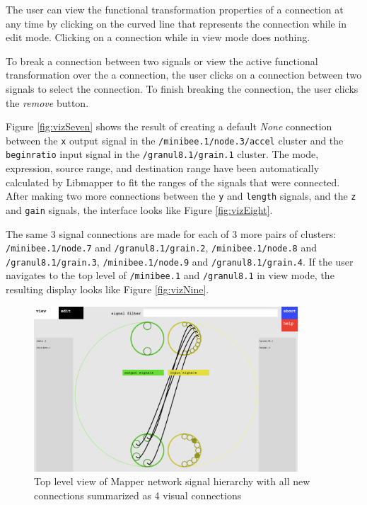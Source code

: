 The user can view the functional transformation properties of a connection at any time by clicking on the curved line that represents the connection while in edit mode. Clicking on a connection while in view mode does nothing.

To break a connection between two signals or view the active functional transformation over the a connection, the user clicks on a connection between two signals to select the connection. To finish breaking the connection, the user clicks the \emph{remove} button.

Figure \ref{fig:vizSeven} shows the result of creating a default \emph{None} connection between the \verb#x# output signal in the \verb#/minibee.1/node.3/accel# cluster and the \verb#beginratio# input signal in the \verb#/granul8.1/grain.1# cluster. The mode, expression, source range, and destination range have been automatically calculated by Libmapper to fit the ranges of the signals that were connected. After making two more connections between the \verb#y# and \verb#length# signals, and the \verb#z# and \verb#gain# signals, the interface looks like Figure \ref{fig:vizEight}.

The same 3 signal connections are made for each of 3 more pairs of clusters: \verb#/minibee.1/node.7# and \verb#/granul8.1/grain.2#, \verb#/minibee.1/node.8# and \verb#/granul8.1/grain.3#, \verb#/minibee.1/node.9# and \verb#/granul8.1/grain.4#. If the user navigates to the top level of \verb#/minibee.1# and \verb#/granul8.1# in view mode, the resulting display looks like Figure \ref{fig:vizNine}.

\begin{figure}[hp]
\centering
\includegraphics[width=0.88\textwidth]{vizmapperTen.png}
\caption{Top level view of Mapper network signal hierarchy with all new connections summarized as 4 visual connections}
\label{fig:vizTen}
\end{figure}

